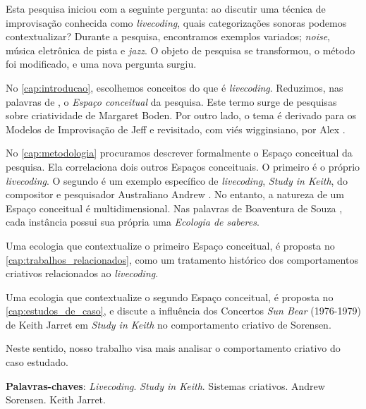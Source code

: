 \setlength{\absparsep}{18pt} %
\begin{resumo}
Esta pesquisa iniciou com a seguinte pergunta: ao discutir uma técnica de improvisação conhecida como \textit{livecoding}, quais categorizações sonoras podemos contextualizar? Durante a pesquisa, encontramos exemplos variados; \emph{noise}, música eletrônica de pista e \emph{jazz}. O objeto de pesquisa se transformou, o método foi modificado, e uma nova pergunta surgiu.

No \autoref{cap:introducao}, escolhemos conceitos do que é \emph{livecoding}. Reduzimos, nas palavras de , o \emph{Espaço conceitual} da pesquisa. Este termo surge de pesquisas sobre criatividade de Margaret Boden. Por outro lado, o tema é derivado para os Modelos de Improvisação de Jeff  e revisitado, com viés wigginsiano, por Alex .

No \autoref{cap:metodologia} procuramos descrever formalmente o Espaço conceitual da pesquisa. Ela correlaciona dois outros Espaços conceituais. O primeiro é o próprio \emph{livecoding}. O segundo é um exemplo específico de \emph{livecoding}, \emph{Study in Keith}, do compositor e pesquisador Australiano Andrew . No entanto, a natureza de um Espaço conceitual é multidimensional. Nas palavras de Boaventura de Souza , cada instância possui sua própria uma \emph{Ecologia de saberes}.

Uma ecologia que contextualize o primeiro Espaço conceitual, é proposta no \autoref{cap:trabalhos_relacionados}, como um tratamento histórico dos comportamentos criativos relacionados ao \emph{livecoding}.

Uma ecologia que contextualize o segundo Espaço conceitual, é proposta no \autoref{cap:estudos_de_caso}, e discute a influência dos Concertos \emph{Sun Bear} (1976-1979) de Keith Jarret em \emph{Study in Keith} no comportamento criativo de Sorensen.

Neste sentido, nosso trabalho visa mais analisar o comportamento criativo do caso estudado. 

\vspace{\onelineskip}
\noindent
\textbf{Palavras-chaves}: \textit{Livecoding}. \emph{Study in Keith}. Sistemas criativos. Andrew Sorensen. Keith Jarret.
\end{resumo}

